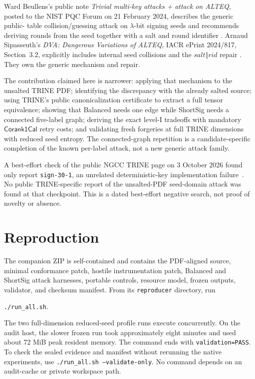 \documentclass[11pt,a4paper]{article}
\newcommand{\Corank}{\mathsf{Corank1Cal}}
\begin{document}
Ward Beullens's public note \emph{Trivial multi-key attacks + attack on ALTEQ},
posted to the NIST PQC Forum on 21 February 2024, describes the generic public-
table collision/guessing attack on $\lambda$-bit signing seeds and recommends
deriving rounds from the seed together with a salt and round identifier
\cite{beullens2024}.  Arnaud Sipasseuth's \emph{DVA: Dangerous Variations of
ALTEQ}, IACR ePrint 2024/817, Section~3.2, explicitly includes internal seed
collisions and the $\mathit{salt}\mathbin\Vert\mathit{rid}$ repair
\cite{sipasseuth2024}.  They own the generic mechanism and repair.

The contribution claimed here is narrower: applying that mechanism to the
unsalted TRINE PDF; identifying the discrepancy with the already salted source;
using TRINE's public canonicalization certificate to extract a full tensor
equivalence; showing that Balanced needs one edge while ShortSig needs a
connected five-label graph; deriving the exact level-I tradeoffs with mandatory
$\Corank$ retry costs; and validating fresh forgeries at full TRINE dimensions
with reduced seed entropy.  The connected-graph repetition is a
candidate-specific completion of the known per-label attack, not a new generic
attack family.

A best-effort check of the public NGCC TRINE page on 3 October 2026 found only
report \texttt{sign-30-1}, an unrelated deterministic-key implementation
failure~\cite{ngcc-trine}.  No public TRINE-specific report of the unsalted-PDF
seed-domain attack was found at that checkpoint.  This is a dated best-effort
negative search, not proof of novelty or absence.

\section{Reproduction}

The companion ZIP is self-contained and contains the PDF-aligned source,
minimal conformance patch, hostile instrumentation patch, Balanced and ShortSig
attack harnesses, portable controls, resource model, frozen outputs, validator,
and checksum manifest.  From its \texttt{reproducer} directory, run
\begin{center}
                 \texttt{./run\_all.sh}.
\end{center}
The two full-dimension reduced-seed profile runs execute concurrently.  On the
audit host, the slower frozen run took approximately eight minutes and used
about 72 MiB peak resident memory.  The command ends with
\texttt{validation=PASS}.  To check the sealed evidence and manifest without
rerunning the native experiments, use
\texttt{./run\_all.sh --validate-only}.  No command depends on an audit-cache or
private workspace path.
\end{document}
